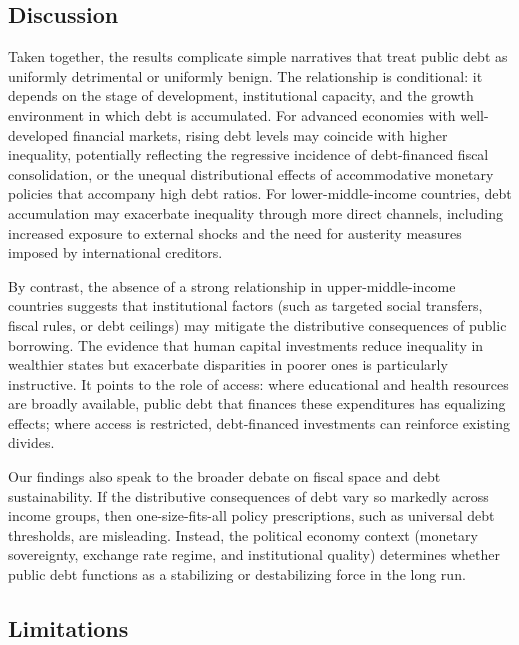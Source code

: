 \documentclass[12pt, titlepage]{article}
\numberwithin{equation}{section}
\begin{document}
	\subsection{Discussion}

	Taken together, the results complicate simple narratives that treat public debt as uniformly detrimental or uniformly benign. The relationship is conditional: it depends on the stage of development, institutional capacity, and the growth environment in which debt is accumulated. For advanced economies with well-developed financial markets, rising debt levels may coincide with higher inequality, potentially reflecting the regressive incidence of debt-financed fiscal consolidation, or the unequal distributional effects of accommodative monetary policies that accompany high debt ratios. For lower-middle-income countries, debt accumulation may exacerbate inequality through more direct channels, including increased exposure to external shocks and the need for austerity measures imposed by international creditors.

	By contrast, the absence of a strong relationship in upper-middle-income countries suggests that institutional factors (such as targeted social transfers, fiscal rules, or debt ceilings) may mitigate the distributive consequences of public borrowing. The evidence that human capital investments reduce inequality in wealthier states but exacerbate disparities in poorer ones is particularly instructive. It points to the role of access: where educational and health resources are broadly available, public debt that finances these expenditures has equalizing effects; where access is restricted, debt-financed investments can reinforce existing divides.

	Our findings also speak to the broader debate on fiscal space and debt sustainability. If the distributive consequences of debt vary so markedly across income groups, then one-size-fits-all policy prescriptions, such as universal debt thresholds, are misleading. Instead, the political economy context (monetary sovereignty, exchange rate regime, and institutional quality) determines whether public debt functions as a stabilizing or destabilizing force in the long run.

    \subsection{Limitations}
    
\end{document}
